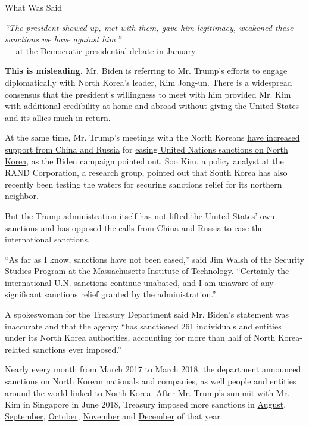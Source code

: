What Was Said

\emph{``The president showed up, met with them, gave him legitimacy,
weakened these sanctions we have against him.''}\\
--- at the Democratic presidential debate in January

\textbf{This is misleading.} Mr. Biden is referring to Mr. Trump's
efforts to engage diplomatically with North Korea's leader, Kim Jong-un.
There is a widespread consensus that the president's willingness to meet
with him provided Mr. Kim with additional credibility at home and abroad
without giving the United States and its allies much in return.

At the same time, Mr. Trump's meetings with the North Koreans
\href{https://foreignpolicy.com/2020/01/07/trump-avoids-north-korea-sanctions-missile-tests/}{have
increased support from China and Russia} for
\href{https://www.reuters.com/article/us-northkorea-usa-un-china-analysis/u-s-led-pressure-fractures-as-china-russia-push-for-north-korea-sanctions-relief-idUSKBN1YL0OX}{easing
United Nations sanctions on North Korea}, as the Biden campaign pointed
out. Soo Kim, a policy analyst at the RAND Corporation, a research
group, pointed out that South Korea has also recently been testing the
waters for securing sanctions relief for its northern neighbor.

But the Trump administration itself has not lifted the United States'
own sanctions and has opposed the calls from China and Russia to ease
the international sanctions.

``As far as I know, sanctions have not been eased,'' said Jim Walsh of
the Security Studies Program at the Massachusetts Institute of
Technology. ``Certainly the international U.N. sanctions continue
unabated, and I am unaware of any significant sanctions relief granted
by the administration.''

A spokeswoman for the Treasury Department said Mr. Biden's statement was
inaccurate and that the agency ``has sanctioned 261 individuals and
entities under its North Korea authorities, accounting for more than
half of North Korea-related sanctions ever imposed.''

Nearly every month from March 2017 to March 2018, the department
announced sanctions on North Korean nationals and companies, as well
people and entities around the world linked to North Korea. After Mr.
Trump's summit with Mr. Kim in Singapore in June 2018, Treasury imposed
more sanctions in
\href{https://home.treasury.gov/news/press-releases/sm454}{August},
\href{https://home.treasury.gov/news/press-releases/sm481}{September},
\href{https://www.treasury.gov/resource-center/sanctions/OFAC-Enforcement/Pages/20181004.aspx}{October},
\href{https://home.treasury.gov/news/press-releases/sm552}{November} and
\href{https://home.treasury.gov/news/press-releases/sm568}{December} of
that year.

